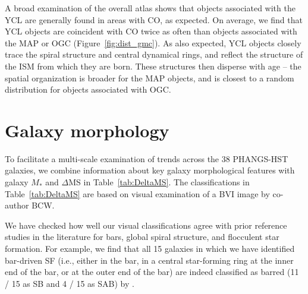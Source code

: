 \documentclass[linenumbers]{aastex63}
\begin{document}
A broad examination of the overall atlas shows that objects associated with the YCL are generally found in areas with CO, as expected. On average, we find that YCL objects are coincident with CO twice as often than objects associated with the MAP or OGC (Figure~\ref{fig:dist_gmc}).   As also expected, YCL objects closely trace the spiral structure and central dynamical rings, and reflect the structure of the ISM from which they are born.  These structures then disperse with age -- the spatial organization is broader for the MAP objects, and is closest to a random distribution for objects associated with OGC.


\section{Galaxy morphology}
To facilitate a multi-scale examination of trends across the 38 PHANGS-HST galaxies, we combine information about key galaxy morphological features with galaxy $M_*$ and $\Delta$MS in Table~\ref{tab:DeltaMS}. The classifications in Table~\ref{tab:DeltaMS} are based on visual examination of a BVI image by co-author BCW. 

We have checked how well our visual classifications agree with prior reference studies in the literature for bars, global spiral structure, and flocculent star formation. For example, we find that all 15 galaxies in which we have identified 
bar-driven SF (i.e., either in the bar, in a central star-forming ring at the inner end of the bar, or at the outer end of the bar) are indeed classified as barred (11 / 15 as SB and 4 / 15 as SAB) by \citet{buta15}. 
\end{document}
